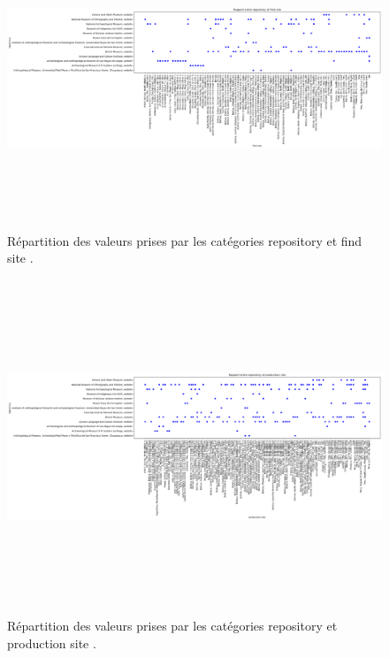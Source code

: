 \documentclass[a4paper, twoside]{book}
\begin{document}
\begin{figure}[!h]
        \begin{center}
        		\includegraphics[height=9cm, angle=-90]{../images/R_repository_find_site.png}
	\end{center}
    \caption{Répartition des valeurs prises par les catégories \og repository \fg \:et \og find site \fg.}     
    \label{fig:repository_find_site}
\end{figure}

\begin{figure}[!h]
        \begin{center}
        		\includegraphics[height=10cm, angle=-90]{../images/R_repository_production_site.png}
	\end{center}
    \caption{Répartition des valeurs prises par les catégories \og repository \fg \:et \og production site \fg.}     
    \label{fig:repository_production_site}
\end{figure}
\end{document}
